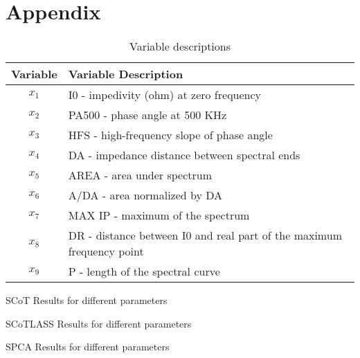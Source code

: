 \documentclass[11pt,letterpaper]{report}
\begin{document}
\section*{Appendix}
\begin{table}[htpb!]
\caption{Variable descriptions}
\label{tab1:dta_vars}
\begin{center}
 \begin{tabular}{||c l||}
 \hline
Variable & Variable Description \\ [0.5ex] 
 \hline\hline
 $x_{1}$ & I0 - impedivity (ohm) at zero frequency \\ 
 \hline
 $x_{2}$ & 	PA500 - phase angle at 500 KHz \\
 \hline
 $x_{3}$ & HFS - high-frequency slope of phase angle \\
 \hline
 $x_{4}$ & DA - impedance distance between spectral ends \\
 \hline
 $x_{5}$ & AREA - area under spectrum \\
 \hline
 $x_{6}$ & 	A/DA - area normalized by DA \\
 \hline
 $x_{7}$ & MAX IP - maximum of the spectrum \\
 \hline
 $x_{8}$ & 	DR - distance between I0 and real part of the maximum frequency point \\
 \hline
 $x_{9}$ & P - length of the spectral curve \\ [1ex] 
 \hline
\end{tabular}
\end{center}
\end{table}

\begin{table}[htpb!]
    \centering
    \caption{SCoT Results for different parameters}
    \label{rstl:scot}
    
\end{table}

\begin{table}[htpb!]
    \centering
    \caption{SCoTLASS Results for different parameters}
    \label{rstl:scotlass}
    
\end{table}

\begin{table}[htpb!]
    \centering
    \caption{SPCA Results for different parameters}
    \label{rstl:spca}
    
\end{table}
\end{document}
